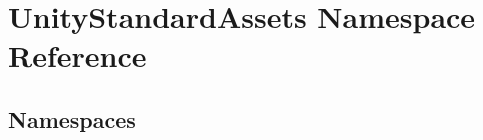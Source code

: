 \hypertarget{namespace_unity_standard_assets}{}\section{Unity\+Standard\+Assets Namespace Reference}
\label{namespace_unity_standard_assets}
\subsection*{Namespaces}
\begin{DoxyCompactItemize}
\end{DoxyCompactItemize}
